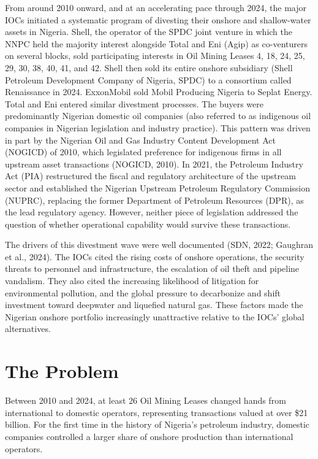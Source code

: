 \documentclass[twoside,fontset=lmodern]{mitthesis}
\begin{document}
From around 2010 onward, and at an accelerating pace through 2024, the
major IOCs initiated a systematic program of divesting their onshore and
shallow-water assets in Nigeria. Shell, the operator of the SPDC joint
venture in which the NNPC held the majority interest alongside Total and
Eni (Agip) as co-venturers on several blocks, sold participating
interests in Oil Mining Leases 4, 18, 24, 25, 29, 30, 38, 40, 41, and
42. Shell then sold its entire onshore subsidiary (Shell Petroleum
Development Company of Nigeria, SPDC) to a consortium called Renaissance
in 2024. ExxonMobil sold Mobil Producing Nigeria to Seplat Energy. Total
and Eni entered similar divestment processes. The buyers were
predominantly Nigerian domestic oil companies (also referred to as
indigenous oil companies in Nigerian legislation and industry practice).
This pattern was driven in part by the Nigerian Oil and Gas Industry
Content Development Act (NOGICD) of 2010, which legislated preference
for indigenous firms in all upstream asset transactions (NOGICD, 2010).
In 2021, the Petroleum Industry Act (PIA) restructured the fiscal and
regulatory architecture of the upstream sector and established the
Nigerian Upstream Petroleum Regulatory Commission (NUPRC), replacing the
former Department of Petroleum Resources (DPR), as the lead regulatory
agency. However, neither piece of legislation addressed the question of
whether operational capability would survive these transactions.

The drivers of this divestment wave were well documented (SDN, 2022;
Gaughran et al., 2024). The IOCs cited the rising costs of onshore
operations, the security threats to personnel and infrastructure, the
escalation of oil theft and pipeline vandalism. They also cited the
increasing likelihood of litigation for environmental pollution, and the
global pressure to decarbonize and shift investment toward deepwater and
liquefied natural gas. These factors made the Nigerian onshore portfolio
increasingly unattractive relative to the IOCs' global alternatives.

\hypertarget{the-problem}{%
\section{The Problem}\label{the-problem}}

Between 2010 and 2024, at least 26 Oil Mining Leases changed hands from
international to domestic operators, representing transactions valued at
over \$21 billion. For the first time in the history of Nigeria's
petroleum industry, domestic companies controlled a larger share of
onshore production than international operators.
\end{document}
